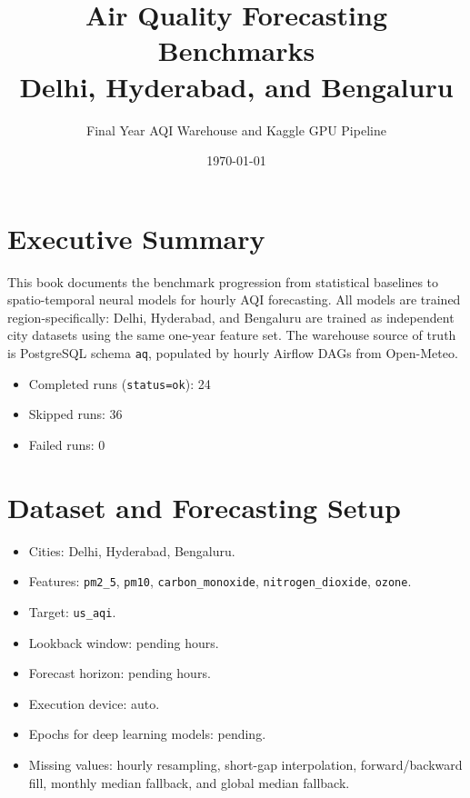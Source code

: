 \documentclass[11pt,a4paper,oneside]{book}
\title{\Huge\textbf{Air Quality Forecasting Benchmarks}\\\Large Delhi, Hyderabad, and Bengaluru}
\author{Final Year AQI Warehouse and Kaggle GPU Pipeline}
\date{\today}
\begin{document}
\maketitle
\tableofcontents

\chapter{Executive Summary}
This book documents the benchmark progression from statistical baselines to spatio-temporal neural models for hourly AQI forecasting.
All models are trained region-specifically: Delhi, Hyderabad, and Bengaluru are trained as independent city datasets using the same one-year feature set.
The warehouse source of truth is PostgreSQL schema \texttt{aq}, populated by hourly Airflow DAGs from Open-Meteo.
\begin{itemize}
  \item Completed runs (\texttt{status=ok}): 24
  \item Skipped runs: 36
  \item Failed runs: 0
\end{itemize}

\chapter{Dataset and Forecasting Setup}
\begin{itemize}
  \item Cities: Delhi, Hyderabad, Bengaluru.
  \item Features: \texttt{pm2\_5}, \texttt{pm10}, \texttt{carbon\_monoxide}, \texttt{nitrogen\_dioxide}, \texttt{ozone}.
  \item Target: \texttt{us\_aqi}.
  \item Lookback window: pending hours.
  \item Forecast horizon: pending hours.
  \item Execution device: auto.
  \item Epochs for deep learning models: pending.
  \item Missing values: hourly resampling, short-gap interpolation, forward/backward fill, monthly median fallback, and global median fallback.
\end{itemize}
\end{document}
